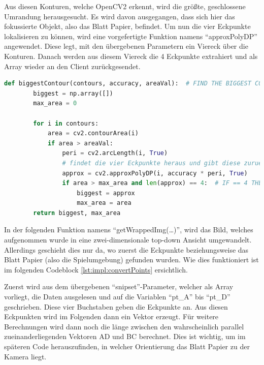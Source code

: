 Aus diesen Konturen, welche OpenCV2 erkennt, wird die größte, geschlossene Umrandung herausgesucht. Es wird davon ausgegangen, dass sich hier das fokussierte Objekt, also das Blatt Papier, befindet. Um nun die vier Eckpunkte lokalisieren zu können, wird eine vorgefertigte Funktion namens ``approxPolyDP'' angewendet. Diese legt, mit den übergebenen Parametern ein Viereck über die Konturen. Danach werden aus diesem Viereck die 4 Eckpunkte extrahiert und als Array wieder an den Client zurückgesendet.


\begin{lstlisting}[caption=approxPolyDP,language=Python,label=lst:impl:findBiggestContour]
    def biggestContour(contours, accuracy, areaVal):  # FIND THE BIGGEST CONTOUR
        biggest = np.array([])
        max_area = 0

        for i in contours:
            area = cv2.contourArea(i)
            if area > areaVal:
                peri = cv2.arcLength(i, True)
                # findet die vier Eckpunkte heraus und gibt diese zurueck
                approx = cv2.approxPolyDP(i, accuracy * peri, True)
                if area > max_area and len(approx) == 4:  # IF == 4 THEN SQUARE
                    biggest = approx
                    max_area = area
        return biggest, max_area
\end{lstlisting}

In der folgenden Funktion namens ``getWrappedImg(\dots)'', wird das Bild, welches aufgenommen wurde in eine zwei-dimensionale top-down Ansicht umgewandelt. Allerdings geschieht dies nur da, wo zuerst die Eckpunkte beziehungsweise das Blatt Papier (also die Spielumgebung) gefunden wurden. Wie dies funktioniert ist im folgenden Codeblock
\ref{lst:impl:convertPoints} ersichtlich.


Zuerst wird aus dem übergebenen ``snipset''-Parameter, welcher als Array vorliegt, die Daten ausgelesen und auf die Variablen ``pt\_A'' bis ``pt\_D'' geschrieben. Diese vier Buchstaben geben die Eckpunkte an. Aus diesen Eckpunkten wird im Folgenden dann ein Vektor erzeugt. Für weitere Berechnungen wird dann noch die länge zwischen den wahrscheinlich parallel zueinanderliegenden Vektoren AD und BC berechnet. Dies ist wichtig, um im späteren Code herauszufinden, in welcher Orientierung das Blatt Papier zu der Kamera liegt.

